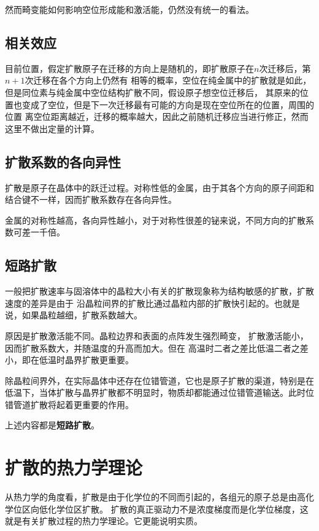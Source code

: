             然而畸变能如何影响空位形成能和激活能，仍然没有统一的看法。
        \subsection{相关效应}
            目前位置，假定扩散原子在迁移的方向上是随机的，即扩散原子在$n$次迁移后，第$n+1$次迁移在各个方向上仍然有
            相等的概率，空位在纯金属中的扩散就是如此，但是同位素与纯金属中空位结构扩散不同，假设原子想空位迁移后，
            其原来的位置也变成了空位，但是下一次迁移最有可能的方向是现在空位所在的位置，周围的位置
            离空位距离越近，迁移的概率越大，因此之前随机迁移应当进行修正，然而这里不做出定量的计算。

        \subsection{扩散系数的各向异性}
            扩散是原子在晶体中的跃迁过程。对称性低的金属，由于其各个方向的原子间距和结合键不一样，因而扩散系数存在各向异性。

            金属的对称性越高，各向异性越小，对于对称性很差的铋来说，不同方向的扩散系数可差一千倍。

        \subsection{短路扩散}
            一般把扩散速率与固溶体中的晶粒大小有关的扩散现象称为结构敏感的扩散，扩散速度的差异是由于
            沿晶粒间界的扩散比通过晶粒内部的扩散快引起的。也就是说，如果晶粒越细，扩散系数越大。

            原因是扩散激活能不同。晶粒边界和表面的点阵发生强烈畸变，
            扩散激活能小，因而扩散系数大，并随温度的升高而加大。但在
            高温时二者之差比低温二者之差小，即在低温时晶界扩散更重要。

            除晶粒间界外，在实际晶体中还存在位错管道，它也是原子扩散的渠道，特别是在低温下，当体扩散与晶界扩散都不明显时，物质却都能通过位错管道输送。此时位错管道扩散将起着更重要的作用。

            上述内容都是\textbf{短路扩散}。
    \section{扩散的热力学理论}
        从热力学的角度看，扩散是由于化学位的不同而引起的，各组元的原子总是由高化学位区向低化学位区扩散。
        扩散的真正驱动力不是浓度梯度而是化学位梯度，这就是有关扩散过程的热力学理论。它更能说明实质。

